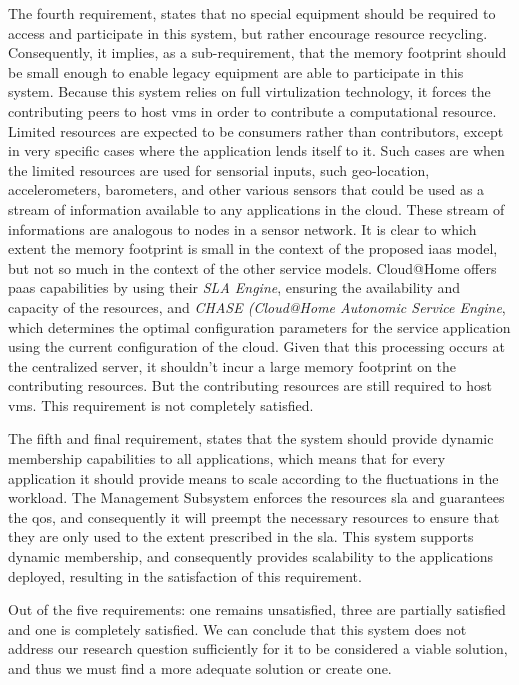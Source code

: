 \documentclass[12pt, titlepage]{uo_temp}
\begin{document}
     The fourth requirement, states that no special equipment should be required to access
     and participate in this system, but rather encourage resource
     recycling. Consequently, it implies, as a sub-requirement, that the memory footprint
     should be small enough to enable legacy equipment are able to participate in this
     system. Because this system relies on full virtulization technology, it forces the
     contributing peers to host \gls{vm}s in order to contribute a computational
     resource. Limited resources are expected to be consumers rather than contributors,
     except in very specific cases where the application lends itself to it. Such cases
     are when the limited resources are used for sensorial inputs, such geo-location,
     accelerometers, barometers, and other various sensors that could be used as a
     stream of information available to any applications in the cloud. These stream of
     informations are analogous to nodes in a sensor network. It is clear
     to which extent the memory footprint is small in the context of the proposed
     \gls{iaas} model, but not so much in the context of the other service
     models. Cloud@Home offers \gls{paas} capabilities by using their \emph{SLA Engine},
     ensuring the availability and capacity of the resources, and \emph{CHASE (Cloud@Home
       Autonomic Service Engine}, which determines the optimal configuration parameters
     for the service application using the current configuration of the cloud. Given that
     this processing occurs at the centralized server, it shouldn't incur a large memory
     footprint on the contributing resources. But the contributing resources are still
     required to host \gls{vm}s. This requirement is not completely satisfied.

     The fifth and final requirement, states that the system should provide dynamic
     membership capabilities to all applications, which means that for every application
     it should provide means to scale according to the fluctuations in the workload. The
     Management Subsystem enforces the resources \gls{sla} and guarantees the \gls{qos}, and
     consequently it will preempt the necessary resources to ensure that they are
     only used to the extent prescribed in the \gls{sla}. This system supports
     dynamic membership, and consequently provides scalability to the applications
     deployed, resulting in the satisfaction of this requirement.

     Out of the five requirements: one remains unsatisfied, three are partially satisfied
     and one is completely satisfied. We can conclude that this system does not address
     our research question sufficiently for it to be considered a viable solution, and
     thus we must find a more adequate solution or create one.
\end{document}
